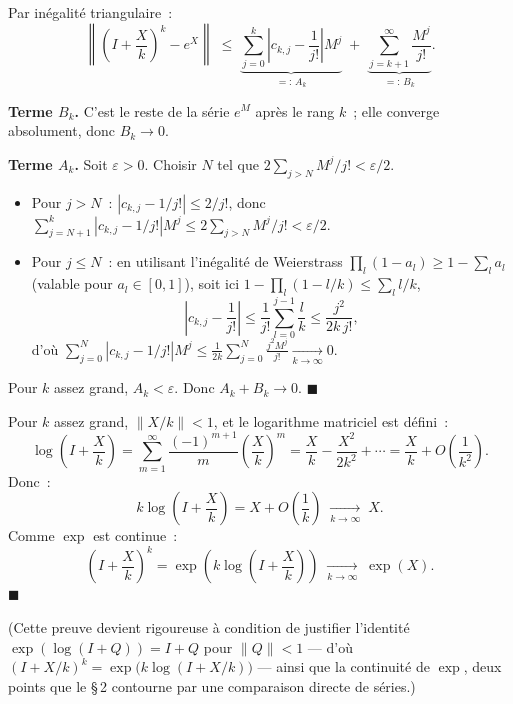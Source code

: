 
\begin{mdframed}[style=proofbar]
  Par inégalité triangulaire~:
  \[
    \left\|\left(I+\frac{X}{k}\right)^{\!k} - e^X\right\|
    \;\leq\;
    \underbrace{\sum_{j=0}^{k}\!\left|c_{k,j}-\frac{1}{j!}\right|M^j}_{=:\,A_k}
    \;+\;
    \underbrace{\sum_{j=k+1}^{\infty}\frac{M^j}{j!}}_{=:\,B_k}.
  \]

  \textbf{Terme $B_k$.}\enspace
  C'est le reste de la série $e^M$ après le rang $k$~; elle converge
  absolument, donc $B_k \to 0$.

  \textbf{Terme $A_k$.}\enspace
  Soit $\varepsilon > 0$. Choisir $N$ tel que $2\sum_{j>N}M^j/j! < \varepsilon/2$.
  \begin{itemize}
    \item Pour $j > N$~: $|c_{k,j}-1/j!| \leq 2/j!$, donc
          $\sum_{j=N+1}^{k}|c_{k,j}-1/j!|M^j \leq 2\sum_{j>N}M^j/j! < \varepsilon/2$.
    \item Pour $j \leq N$~: en utilisant l'inégalité de Weierstrass
          $\prod_l(1-a_l)\geq 1-\sum_l a_l$ (valable pour $a_l\in[0,1]$), soit ici
          $1-\prod_l(1-l/k)\leq\sum_l l/k$,
          \[
            \left|c_{k,j}-\frac{1}{j!}\right|
            \leq \frac{1}{j!}\sum_{l=0}^{j-1}\frac{l}{k}
            \leq \frac{j^2}{2k\,j!},
          \]
          d'où $\sum_{j=0}^{N}|c_{k,j}-1/j!|M^j
          \leq \frac{1}{2k}\sum_{j=0}^N\frac{j^2 M^j}{j!}
          \xrightarrow[k\to\infty]{} 0$.
  \end{itemize}
  Pour $k$ assez grand, $A_k < \varepsilon$.
  Donc $A_k + B_k \to 0$. \hfill$\blacksquare$
\end{mdframed}

\decsep{}


\begin{mdframed}[style=proofbar]
  Pour $k$ assez grand, $\|X/k\| < 1$, et le logarithme matriciel est défini~:
  \[
    \log\!\left(I + \frac{X}{k}\right)
    = \sum_{m=1}^{\infty}\frac{{(-1)}^{m+1}}{m}\left(\frac{X}{k}\right)^{\!m}
    = \frac{X}{k} - \frac{X^2}{2k^2} + \cdots
    = \frac{X}{k} + O\!\left(\frac{1}{k^2}\right).
  \]
  Donc~:
  \[
    k\log\!\left(I+\frac{X}{k}\right) = X + O\!\left(\frac{1}{k}\right)
    \;\xrightarrow[k\to\infty]{}\; X.
  \]
  Comme $\exp$ est continue~:
  \[
    \left(I + \frac{X}{k}\right)^{\!k}
    = \exp\!\left(k\log\!\left(I+\frac{X}{k}\right)\right)
    \;\xrightarrow[k\to\infty]{}\; \exp(X).
  \]
  \hfill$\blacksquare$

  \smallskip\noindent
  (Cette preuve devient rigoureuse à condition de justifier l'identité
  $\exp(\log(I+Q)) = I+Q$ pour $\|Q\| < 1$ — d'où
  ${(I+X/k)}^k = \exp\bigl(k\log(I+X/k)\bigr)$ — ainsi que la continuité
  de $\exp$, deux points que le §\,2 contourne par une comparaison
  directe de séries.)
\end{mdframed}

